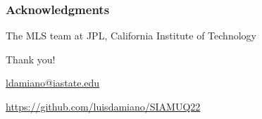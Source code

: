 \documentclass[aspectratio=169,t,xcolor=table]{beamer}
\begin{document}
\begin{frame}
  \frametitle{Acknowledgments}
  \centering

  The MLS team at JPL, California Institute of Technology

  \vfill

  {\huge Thank you!}

  \vfill

  \href{ldamiano@iastate.edu}{
    ldamiano@iastate.edu}

  \href{https://github.com/luisdamiano/SIAMUQ22}{
https://github.com/luisdamiano/SIAMUQ22}

\end{frame}



\end{document}
